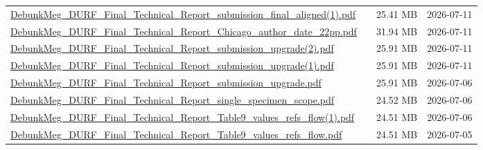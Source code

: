 \documentclass[UTF8,fontset=fandol,10pt,a4paper]{ctexart}
\begin{document}
\begin{longtable}{@{}L{\dimexpr\linewidth-50mm-6\tabcolsep\relax}R{8mm}R{16mm}R{26mm}@{}}
\href{https://chatgpt.com/library?file_id=libfile_0a3b632145c0819196ad4fd3847bed6c&account_id=personal}{DebunkMeg\_\allowbreak{}DURF\_\allowbreak{}Final\_\allowbreak{}Technical\_\allowbreak{}Report\_\allowbreak{}submission\_\allowbreak{}final\_\allowbreak{}aligned(1).\allowbreak{}pdf} & \textemdash{} & 25.41 MB & 2026-07-11 \\
\href{https://chatgpt.com/library?file_id=libfile_3747eb24a8848191a922b97889fd1b54&account_id=personal}{DebunkMeg\_\allowbreak{}DURF\_\allowbreak{}Final\_\allowbreak{}Technical\_\allowbreak{}Report\_\allowbreak{}Chicago\_\allowbreak{}author\_\allowbreak{}date\_\allowbreak{}22pp.\allowbreak{}pdf} & \textemdash{} & 31.94 MB & 2026-07-11 \\
\href{https://chatgpt.com/library?file_id=libfile_a72a712270c08191bf43c990a72a8066&account_id=personal}{DebunkMeg\_\allowbreak{}DURF\_\allowbreak{}Final\_\allowbreak{}Technical\_\allowbreak{}Report\_\allowbreak{}submission\_\allowbreak{}upgrade(2).\allowbreak{}pdf} & \textemdash{} & 25.91 MB & 2026-07-11 \\
\href{https://chatgpt.com/library?file_id=libfile_1f010ee6337881918f733107fe39fc1c&account_id=personal}{DebunkMeg\_\allowbreak{}DURF\_\allowbreak{}Final\_\allowbreak{}Technical\_\allowbreak{}Report\_\allowbreak{}submission\_\allowbreak{}upgrade(1).\allowbreak{}pdf} & \textemdash{} & 25.91 MB & 2026-07-11 \\
\href{https://chatgpt.com/library?file_id=libfile_67f4f5a55ad08191b2f6495ea33f3c65&account_id=personal}{DebunkMeg\_\allowbreak{}DURF\_\allowbreak{}Final\_\allowbreak{}Technical\_\allowbreak{}Report\_\allowbreak{}submission\_\allowbreak{}upgrade.\allowbreak{}pdf} & \textemdash{} & 25.91 MB & 2026-07-06 \\
\href{https://chatgpt.com/library?file_id=libfile_b1e49dedccfc81918e881c5c34b2e258&account_id=personal}{DebunkMeg\_\allowbreak{}DURF\_\allowbreak{}Final\_\allowbreak{}Technical\_\allowbreak{}Report\_\allowbreak{}single\_\allowbreak{}specimen\_\allowbreak{}scope.\allowbreak{}pdf} & \textemdash{} & 24.52 MB & 2026-07-06 \\
\href{https://chatgpt.com/library?file_id=libfile_43c873e871a48191a0afc40e6661e247&account_id=personal}{DebunkMeg\_\allowbreak{}DURF\_\allowbreak{}Final\_\allowbreak{}Technical\_\allowbreak{}Report\_\allowbreak{}Table9\_\allowbreak{}values\_\allowbreak{}refs\_\allowbreak{}flow(1).\allowbreak{}pdf} & \textemdash{} & 24.51 MB & 2026-07-06 \\
\href{https://chatgpt.com/library?file_id=libfile_16161ed669a88191928f3ca9b10c897f&account_id=personal}{DebunkMeg\_\allowbreak{}DURF\_\allowbreak{}Final\_\allowbreak{}Technical\_\allowbreak{}Report\_\allowbreak{}Table9\_\allowbreak{}values\_\allowbreak{}refs\_\allowbreak{}flow.\allowbreak{}pdf} & \textemdash{} & 24.51 MB & 2026-07-05 \\

\end{longtable}
\end{document}
